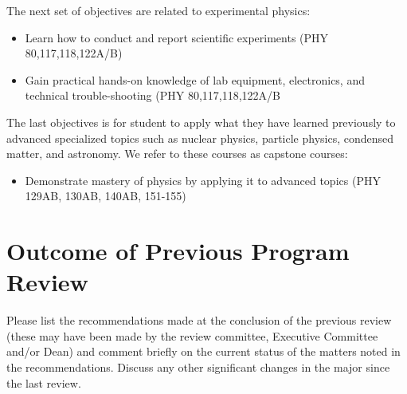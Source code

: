 \documentclass[12pt]{article}
\begin{document}
The next set of objectives are related to experimental physics:
\begin{itemize}
 \item Learn how to conduct and report scientific experiments (PHY 80,117,118,122A/B)
 \item Gain practical hands-on knowledge of lab equipment, electronics, and technical trouble-shooting (PHY 80,117,118,122A/B
\end{itemize}
The last objectives is for student to apply what they have learned previously to advanced specialized topics such as nuclear physics, particle physics, condensed matter, and astronomy.  We refer to these courses as capstone courses:
\begin{itemize}
 \item Demonstrate mastery of physics by applying it to advanced topics (PHY 129AB, 130AB, 140AB, 151-155)
\end{itemize}






\section{Outcome of Previous Program Review}

Please list the recommendations made at the conclusion of the previous review (these may have been made by the review committee, Executive Committee and/or Dean) and comment briefly on the current status of the matters noted in the recommendations. Discuss any other significant changes in the major since the last review.\\[5pt]
\end{document}
